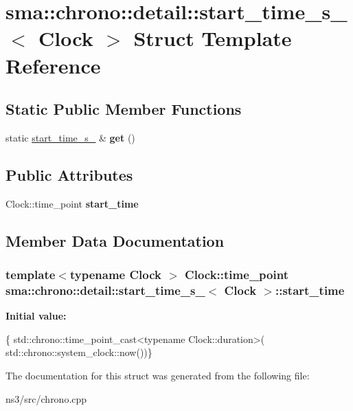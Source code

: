 \hypertarget{structsma_1_1chrono_1_1detail_1_1start__time__s__}{\section{sma\-:\-:chrono\-:\-:detail\-:\-:start\-\_\-time\-\_\-s\-\_\-$<$ Clock $>$ Struct Template Reference}
\label{structsma_1_1chrono_1_1detail_1_1start__time__s__}
}
\subsection*{Static Public Member Functions}
\begin{DoxyCompactItemize}
\item 
\hypertarget{structsma_1_1chrono_1_1detail_1_1start__time__s___a4fc825c5e8273f379c03f658ddae3f2b}{static \hyperlink{structsma_1_1chrono_1_1detail_1_1start__time__s__}{start\-\_\-time\-\_\-s\-\_\-} \& {\bfseries get} ()}\label{structsma_1_1chrono_1_1detail_1_1start__time__s___a4fc825c5e8273f379c03f658ddae3f2b}

\end{DoxyCompactItemize}
\subsection*{Public Attributes}
\begin{DoxyCompactItemize}
\item 
Clock\-::time\-\_\-point {\bfseries start\-\_\-time}
\end{DoxyCompactItemize}


\subsection{Member Data Documentation}
\hypertarget{structsma_1_1chrono_1_1detail_1_1start__time__s___a26a3d3df1475cae83024ef9f93de609e}{
\subsubsection[{start\-\_\-time}]{\setlength{\rightskip}{0pt plus 5cm}template$<$typename Clock $>$ Clock\-::time\-\_\-point {\bf sma\-::chrono\-::detail\-::start\-\_\-time\-\_\-s\-\_\-}$<$ Clock $>$\-::start\-\_\-time}}\label{structsma_1_1chrono_1_1detail_1_1start__time__s___a26a3d3df1475cae83024ef9f93de609e}
{\bfseries Initial value\-:}
\begin{DoxyCode}
\{
          std::chrono::time\_point\_cast<\textcolor{keyword}{typename} Clock::duration>(
              std::chrono::system\_clock::now())\}
\end{DoxyCode}


The documentation for this struct was generated from the following file\-:\begin{DoxyCompactItemize}
\item 
ns3/src/chrono.\-cpp\end{DoxyCompactItemize}
